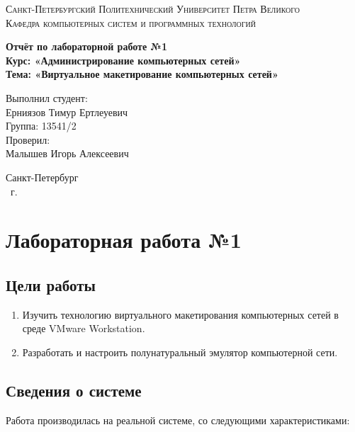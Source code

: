 \documentclass[14pt,a4paper,report]{report}
\begin{document}
\def\contentsname{Содержание}

\begin{titlepage}
	\begin{center}
		\textsc{Санкт-Петербургский Политехнический 
			Университет Петра Великого\\[5mm]
			Кафедра компьютерных систем и программных технологий}
		
		\vfill
		
		\textbf{Отчёт по лабораторной работе №1\\[3mm]
			Курс: «Администрирование компьютерных сетей»\\[3mm]
			Тема: «Виртуальное макетирование компьютерных сетей»\\[35mm]
			}
	\end{center}
	
	\hfill
	\begin{minipage}{.5\textwidth}
		Выполнил студент:\\[2mm] 
		Ерниязов Тимур Ертлеуевич\\
		Группа: 13541/2\\[5mm]
		
		Проверил:\\[2mm] 
		Малышев Игорь Алексеевич
	\end{minipage}
	\vfill
	\begin{center}
		Санкт-Петербург\\ \the\year\ г.
	\end{center}
\end{titlepage}

\tableofcontents
\clearpage
\chapter{Лабораторная работа №1}
\section{Цели работы}
\begin{enumerate}
\item Изучить технологию виртуального макетирования компьютерных сетей в среде VMware Workstation.
\item Разработать и настроить полунатуральный эмулятор компьютерной сети.
\end{enumerate}

\section{Сведения о системе}
Работа производилась на реальной системе, со следующими характеристиками:
\end{document}
